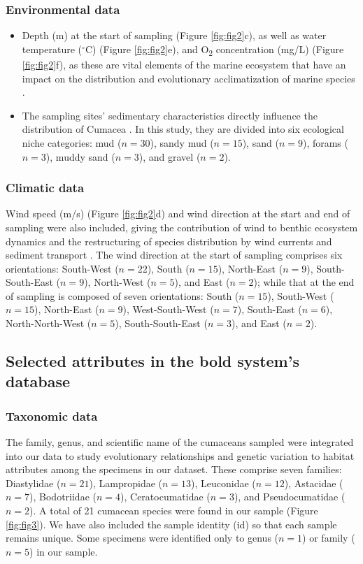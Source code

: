 \subsubsection{Environmental data} 
\begin{itemize}
\item Depth (m) at the start of sampling (Figure \ref{fig:fig2}c), as well as water temperature ($^\circ$C) (Figure \ref{fig:fig2}e), and O\textsubscript{2} concentration (mg/L) (Figure \ref{fig:fig2}f), as these are vital elements of the marine ecosystem that have an impact on the distribution and evolutionary acclimatization of marine species \citep{rex2006global, danovaro2010first}. 
\item The sampling sites' sedimentary characteristics directly influence the distribution of Cumacea \citep{uhlir_adding_2021}. In this study, they are divided into six ecological niche categories: mud ($n=30$), sandy mud ($n=15$), sand ($n=9$), forams ($n=3$), muddy sand ($n=3$), and gravel ($n=2$).
\end{itemize}

\subsubsection{Climatic data} 
Wind speed (m/s) (Figure \ref{fig:fig2}d) and wind direction at the start and end of sampling were also included, giving the contribution of wind to benthic ecosystem dynamics and the restructuring of species distribution by wind currents and sediment transport \citep{siedlecki2016experiments, waga_recent_2020,saeedi_environmental_2022}. The wind direction at the start of sampling comprises six orientations: South-West ($n=22$), South ($n=15$), North-East ($n=9$), South-South-East ($n=9$), North-West ($n=5$), and East ($n=2$); while that at the end of sampling is composed of seven orientations: South ($n=15$), South-West ($n=15$), North-East ($n=9$), West-South-West ($n=7$), South-East ($n=6$), North-North-West ($n=5$), South-South-East ($n=3$), and East ($n=2$). 

\subsection{Selected attributes in the bold system's database}
\subsubsection{Taxonomic data} 
The family, genus, and scientific name of the cumaceans sampled were integrated into our data to study evolutionary relationships and genetic variation to habitat attributes among the specimens in our dataset. These comprise seven families: Diastylidae ($n=21$), Lampropidae ($n=13$), Leuconidae ($n=12$), Astacidae ($n=7$), Bodotriidae ($n=4$), Ceratocumatidae ($n=3$), and Pseudocumatidae ($n=2$). A total of 21 cumacean species were found in our sample (Figure \ref{fig:fig3}). We have also included the sample identity (id) so that each sample remains unique. Some specimens were identified only to genus ($n=1$) or family ($n=5$) in our sample.

